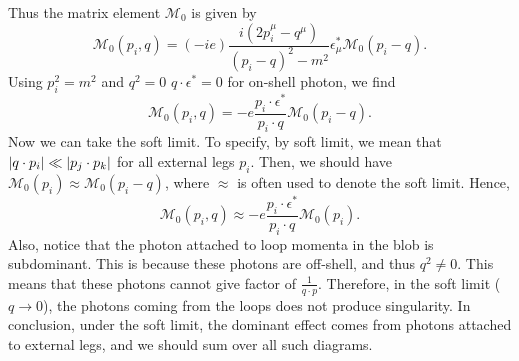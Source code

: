 \documentclass[11pt]{article}
\theoremstyle{definition}
\begin{document}
\begin{center}
\end{center}
Thus the matrix element $\mathcal{M}_0$ is given by
\begin{equation}
    \mathcal{M}_0(p_i,q) = (-ie)\frac{i(2p_i^\mu-q^\mu)}{(p_i-q)^2 - m^2}\epsilon_\mu^*\mathcal{M}_0(p_i-q).
\end{equation}
Using $p_i^2 = m^2$ and $q^2=0$ $q \cdot \epsilon^*=0$ for on-shell photon, we find
\begin{equation}
    \mathcal{M}_0(p_i,q) = -e\frac{p_i \cdot \epsilon^*}{p_i \cdot q}\mathcal{M}_0(p_i-q).
\end{equation}
Now we can take the soft limit. To specify, by soft limit, we mean that $\abs{q\cdot p_i} \ll \abs{p_j \cdot p_k}$ for all external legs $p_i$. Then, we should have $\mathcal{M}_0(p_i) \approx \mathcal{M}_0(p_i-q)$, where $\approx$ is often used to denote the soft limit. Hence,
\begin{equation}
    \mathcal{M}_0(p_i,q) \approx -e\frac{p_i \cdot \epsilon^*}{p_i \cdot q}\mathcal{M}_0(p_i).
\end{equation}
Also, notice that the photon attached to loop momenta in the blob is subdominant. This is because these photons are off-shell, and thus $q^2 \neq 0$. This means that these photons cannot give factor of $\frac{1}{q\cdot p}$. Therefore, in the soft limit ($q\rightarrow 0$), the photons coming from the loops does not produce singularity. In conclusion, under the soft limit, the dominant effect comes from photons attached to external legs, and we should sum over all such diagrams.
\end{document}
